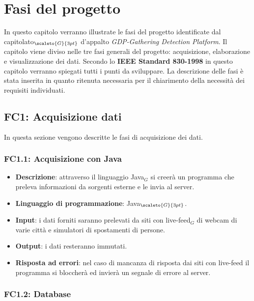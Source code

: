 \chapter{Fasi del progetto}\label{fasiProgetto}
In questo capitolo verranno illustrate le fasi del progetto identificate dal capitolato$_{\scaleto{G}{3pt}}$ d'appalto \textit{GDP-Gathering Detection Platform}. Il capitolo viene diviso nelle tre fasi generali del progetto: acquisizione, elaborazione e visualizzazione dei dati. Secondo lo \textbf{IEEE Standard 830-1998} in questo capitolo verranno spiegati tutti i punti da sviluppare. La descrizione delle fasi è stata inserita in quanto ritenuta necessaria per il chiarimento della necessità dei requisiti individuati. %

\section{FC1: Acquisizione dati}\label{fasiProgettoAquisizioneDati}%
In questa sezione vengono descritte le fasi di acquisizione dei dati.

\subsection{FC1.1: Acquisizione con Java}\label{fasiProgettoAquisizioneDatiJava}

\begin{itemize}
	\item \textbf{Descrizione}: attraverso il linguaggio Java$_G$ si creerà un programma che preleva informazioni da sorgenti esterne e le invia al server.
	\item \textbf{Linguaggio di programmazione}: Java$_{\scaleto{G}{3pt}}$.
	\item \textbf{Input}: i dati forniti saranno prelevati da siti con live-feed$_G$ di webcam di varie città e simulatori di spostamenti di persone.
	\item \textbf{Output}: i dati resteranno immutati.
	\item \textbf{Risposta ad errori}: nel caso di mancanza di risposta dai siti con live-feed il programma si bloccherà ed invierà un segnale di errore al server.
\end{itemize}


\subsection{FC1.2: Database}\label{fasiProgettoAquisizioneDatiDatabase}

